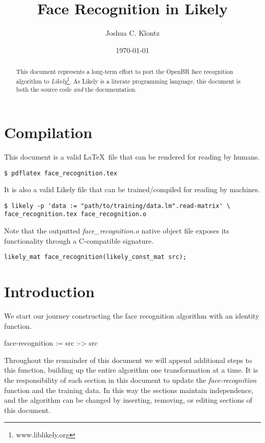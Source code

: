 \documentclass{article}
\title{Face Recognition in Likely}
\author{Joshua C. Klontz}
\date{\today}
\begin{document}
\maketitle

\begin{abstract}
This document represents a long-term effort to port the OpenBR face recognition algorithm to \emph{Likely}\footnote{www.liblikely.org}.
As Likely is a literate programming language, this document is both the source code \emph{and} the documentation.
\end{abstract}

\section{Compilation}
This document is a valid \LaTeX\ file that can be rendered for reading by humans.

\begin{verbatim}
$ pdflatex face_recognition.tex
\end{verbatim}

It is also a valid Likely file that can be trained/compiled for reading by machines.

\begin{verbatim}
$ likely -p 'data := "path/to/training/data.lm".read-matrix' \
face_recognition.tex face_recognition.o
\end{verbatim}

Note that the outputted \emph{face\_recognition.o} native object file exposes its functionality through a C-compatible signature.

\begin{verbatim}
likely_mat face_recognition(likely_const_mat src);
\end{verbatim}

\section{Introduction}
We start our journey constructing the face recognition algorithm with an identity function.

\begin{likely}
face-recognition :=
  src :->
    src
\end{likely}

Throughout the remainder of this document we will append additional steps to this function, building up the entire algorithm one transformation at a time.
It is the responsibility of each section in this document to update the \emph{face-recognition} function and the training data.
In this way the sections maintain independence, and the algorithm can be changed by inserting, removing, or editing sections of this document.
\end{document}
